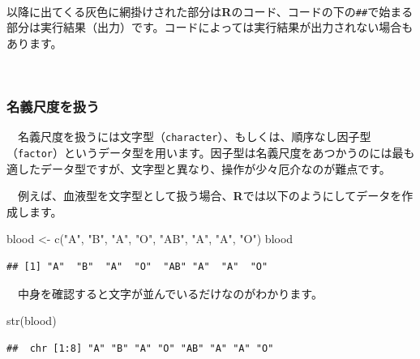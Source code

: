 \documentclass[
  12pt,
]{book}
\newenvironment{Shaded}{\begin{snugshade}}{\end{snugshade}}
\newcommand{\FunctionTok}[1]{\textcolor[rgb]{0.00,0.00,0.00}{#1}}
\newcommand{\NormalTok}[1]{#1}
\newcommand{\OtherTok}[1]{\textcolor[rgb]{0.56,0.35,0.01}{#1}}
\newcommand{\StringTok}[1]{\textcolor[rgb]{0.31,0.60,0.02}{#1}}
\begin{document}
　

\begin{hint-box}
以降に出てくる灰色に網掛けされた部分は\textbf{R}のコード、コードの下の\texttt{\#\#}で始まる部分は実行結果（出力）です。コードによっては実行結果が出力されない場合もあります。

\end{hint-box}

　

\hypertarget{ux540dux7fa9ux5c3aux5ea6ux3092ux6271ux3046}{%
\subsubsection*{名義尺度を扱う}\label{ux540dux7fa9ux5c3aux5ea6ux3092ux6271ux3046}}

　名義尺度を扱うには文字型（\texttt{character}）、もしくは、順序なし因子型（\texttt{factor}）というデータ型を用います。因子型は名義尺度をあつかうのには最も適したデータ型ですが、文字型と異なり、操作が少々厄介なのが難点です。

　例えば、血液型を文字型として扱う場合、\textbf{R}では以下のようにしてデータを作成します。

\begin{Shaded}
\begin{Highlighting}[numbers=left,,]
\NormalTok{blood }\OtherTok{\textless{}{-}} \FunctionTok{c}\NormalTok{(}\StringTok{"A"}\NormalTok{, }\StringTok{"B"}\NormalTok{, }\StringTok{"A"}\NormalTok{, }\StringTok{"O"}\NormalTok{, }\StringTok{"AB"}\NormalTok{, }\StringTok{"A"}\NormalTok{, }\StringTok{"A"}\NormalTok{, }\StringTok{"O"}\NormalTok{)}
\NormalTok{blood}
\end{Highlighting}
\end{Shaded}

\begin{verbatim}
## [1] "A"  "B"  "A"  "O"  "AB" "A"  "A"  "O"
\end{verbatim}

　中身を確認すると文字が並んでいるだけなのがわかります。

\begin{Shaded}
\begin{Highlighting}[numbers=left,,]
\FunctionTok{str}\NormalTok{(blood)}
\end{Highlighting}
\end{Shaded}

\begin{verbatim}
##  chr [1:8] "A" "B" "A" "O" "AB" "A" "A" "O"
\end{verbatim}
\end{document}

